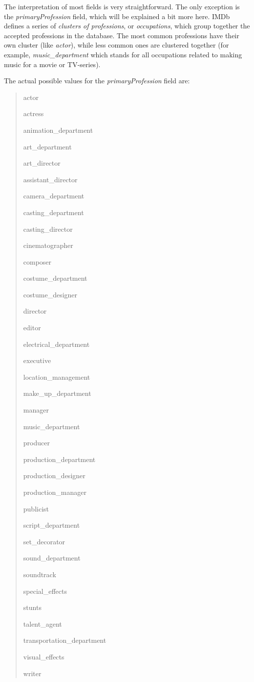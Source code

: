 \documentclass[epsfig,a4paper,11pt,titlepage,twoside,openany]{book}
\begin{document}
The interpretation of most fields is very straightforward. The only exception is the \textit{primaryProfession} field, which will be explained a bit more here. IMDb defines a series of \textit{clusters of professions}, or \textit{occupations}, which group together the accepted professions in the database. The most common professions have their own cluster (like \textit{actor}), while less common ones are clustered together (for example, \textit{music\_department} which stands for all occupations related to making music for a movie or TV-series).

The actual possible values for the \textit{primaryProfession} field are: 

\begin{quote}
    \begin{itemize*}
    \item actor
    \item actress
    \item animation\_department
    \item art\_department
    \item art\_director
    \item assistant\_director
    \item camera\_department
    \item casting\_department
    \item casting\_director
    \item cinematographer
    \item composer
    \item costume\_department
    \item costume\_designer
    \item director
    \item editor
    \item electrical\_department
    \item executive
    \item location\_management
    \item make\_up\_department
    \item manager
    \item music\_department
    \item producer
    \item production\_department
    \item production\_designer
    \item production\_manager
    \item publicist
    \item script\_department
    \item set\_decorator
    \item sound\_department
    \item soundtrack
    \item special\_effects
    \item stunts
    \item talent\_agent
    \item transportation\_department
    \item visual\_effects
    \item writer
    \end{itemize*}
\end{quote}
\end{document}
